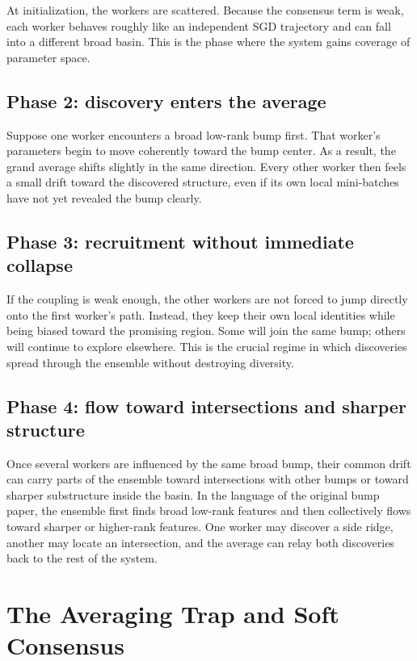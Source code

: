 \documentclass{article}
\begin{document}
At initialization, the workers are scattered. Because the consensus term
is weak, each worker behaves roughly like an independent SGD trajectory
and can fall into a different broad basin. This is the phase where the
system gains coverage of parameter space.

\subsection*{Phase 2: discovery enters the average}

Suppose one worker encounters a broad low-rank bump first. That worker's
parameters begin to move coherently toward the bump center. As a result,
the grand average shifts slightly in the same direction. Every other
worker then feels a small drift toward the discovered structure, even if
its own local mini-batches have not yet revealed the bump clearly.

\subsection*{Phase 3: recruitment without immediate collapse}

If the coupling is weak enough, the other workers are not forced to jump
directly onto the first worker's path. Instead, they keep their own
local identities while being biased toward the promising region. Some
will join the same bump; others will continue to explore elsewhere.
This is the crucial regime in which discoveries spread through the
ensemble without destroying diversity.

\subsection*{Phase 4: flow toward intersections and sharper structure}

Once several workers are influenced by the same broad bump, their common
drift can carry parts of the ensemble toward intersections with other
bumps or toward sharper substructure inside the basin. In the language
of the original bump paper, the ensemble first finds broad low-rank
features and then collectively flows toward sharper or higher-rank
features. One worker may discover a side ridge, another may locate an
intersection, and the average can relay both discoveries back to the
rest of the system.

\section{The Averaging Trap and Soft Consensus}
\end{document}

